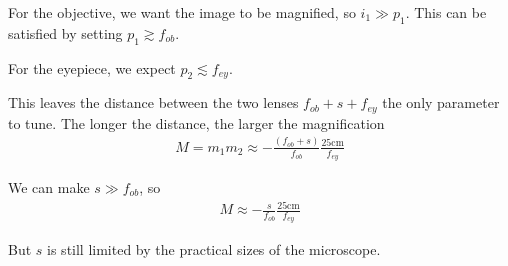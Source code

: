 For the objective, we want the image to be magnified, so $i_1\gg p_1$. This can be satisfied by setting $p_1 \gtrsim f_{ob}$.

For the eyepiece, we expect $p_2\lesssim f_{ey}$. 

This leaves the distance between the two lenses
$f_{ob} + s + f_{ey}$ the only parameter to tune. The longer the distance, the larger the magnification
\begin{align*}
    M=m_1m_2\approx -\frac{\left(f_{ob}+s \right)}{f_{ob}}\frac{25 \mathrm{cm}}{f_{ey}}
\end{align*}

We can make $s \gg f_{ob}$, so
\begin{align*}
    M\approx -\frac{s}{f_{ob}}\frac{25\mathrm{cm}}{f_{ey}}
\end{align*}

But $s$ is still limited by the practical sizes of the microscope. 